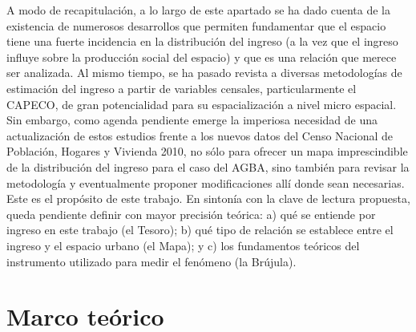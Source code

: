 A modo de recapitulación, a lo largo de este apartado se ha dado cuenta de la existencia de numerosos desarrollos que permiten fundamentar que el espacio tiene una fuerte incidencia en la distribución del ingreso (a la vez que el ingreso influye sobre la producción social del espacio) y que es una relación que merece ser analizada. Al mismo tiempo, se ha pasado revista a diversas metodologías de estimación del ingreso a partir de variables censales, particularmente el CAPECO, de gran potencialidad para su espacialización a nivel micro espacial. Sin embargo, como agenda pendiente emerge la imperiosa necesidad de una actualización de estos estudios frente a los nuevos datos del Censo Nacional de Población, Hogares y Vivienda 2010, no sólo para ofrecer un mapa imprescindible de la distribución del ingreso para el caso del AGBA, sino también para revisar la metodología y eventualmente proponer modificaciones allí donde sean necesarias. Este es el propósito de este trabajo. En sintonía con la clave de lectura propuesta, queda pendiente definir con mayor precisión teórica: a) qué se entiende por ingreso en este trabajo (el Tesoro); b) qué tipo de relación se establece entre el ingreso y el espacio urbano (el Mapa); y c) los fundamentos teóricos del instrumento utilizado para medir el fenómeno (la Brújula). 

\section{Marco teórico}
	
	
